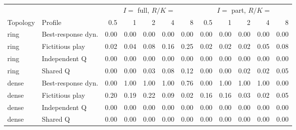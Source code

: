 \begin{tabular}{llrrrrr|rrrrr}
\toprule
& & \multicolumn{5}{c|}{$I=$ full, $R/K=$} & \multicolumn{5}{c}{$I=$ part, $R/K=$} \\
Topology & Profile & 0.5 & 1 & 2 & 4 & 8 & 0.5 & 1 & 2 & 4 & 8 \\
\midrule
ring & Best-response dyn. & 0.00 & 0.00 & 0.00 & 0.00 & 0.00 & 0.00 & 0.00 & 0.00 & 0.00 & 0.00 \\
ring & Fictitious play & 0.02 & 0.04 & 0.08 & 0.16 & 0.25 & 0.02 & 0.02 & 0.02 & 0.05 & 0.08 \\
ring & Independent Q & 0.00 & 0.00 & 0.00 & 0.00 & 0.00 & 0.00 & 0.00 & 0.00 & 0.00 & 0.00 \\
ring & Shared Q & 0.00 & 0.00 & 0.03 & 0.08 & 0.12 & 0.00 & 0.00 & 0.02 & 0.02 & 0.05 \\
dense & Best-response dyn. & 0.00 & 1.00 & 1.00 & 1.00 & 0.76 & 0.00 & 1.00 & 1.00 & 1.00 & 0.00 \\
dense & Fictitious play & 0.20 & 0.19 & 0.22 & 0.09 & 0.02 & 0.16 & 0.16 & 0.03 & 0.02 & 0.05 \\
dense & Independent Q & 0.00 & 0.00 & 0.00 & 0.00 & 0.00 & 0.00 & 0.00 & 0.00 & 0.00 & 0.00 \\
dense & Shared Q & 0.00 & 0.00 & 0.00 & 0.00 & 0.00 & 0.00 & 0.00 & 0.00 & 0.00 & 0.00 \\
\bottomrule
\end{tabular}
